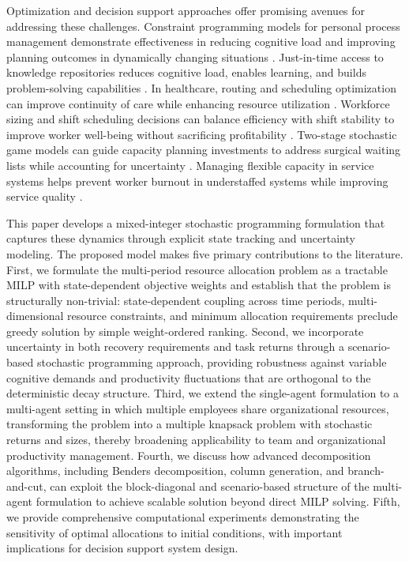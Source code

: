 Optimization and decision support approaches offer promising avenues for addressing these challenges. Constraint programming models for personal process management demonstrate effectiveness in reducing cognitive load and improving planning outcomes in dynamically changing situations \citep{oruç_constraint_2022}. Just-in-time access to knowledge repositories reduces cognitive load, enables learning, and builds problem-solving capabilities \citep{subramani_capability_2021}. In healthcare, routing and scheduling optimization can improve continuity of care while enhancing resource utilization \citep{lahrichi_first_2022}. Workforce sizing and shift scheduling decisions can balance efficiency with shift stability to improve worker well-being without sacrificing profitability \citep{mandal_tactical_2025}. Two-stage stochastic game models can guide capacity planning investments to address surgical waiting lists while accounting for uncertainty \citep{acuna_two_2024}. Managing flexible capacity in service systems helps prevent worker burnout in understaffed systems while improving service quality \citep{yuan_managing_2025}.

This paper develops a mixed-integer stochastic programming formulation that captures these dynamics through explicit state tracking and uncertainty modeling. The proposed model makes five primary contributions to the literature. First, we formulate the multi-period resource allocation problem as a tractable MILP with state-dependent objective weights and establish that the problem is structurally non-trivial: state-dependent coupling across time periods, multi-dimensional resource constraints, and minimum allocation requirements preclude greedy solution by simple weight-ordered ranking. Second, we incorporate uncertainty in both recovery requirements and task returns through a scenario-based stochastic programming approach, providing robustness against variable cognitive demands and productivity fluctuations that are orthogonal to the deterministic decay structure. Third, we extend the single-agent formulation to a multi-agent setting in which multiple employees share organizational resources, transforming the problem into a multiple knapsack problem with stochastic returns and sizes, thereby broadening applicability to team and organizational productivity management. Fourth, we discuss how advanced decomposition algorithms, including Benders decomposition, column generation, and branch-and-cut, can exploit the block-diagonal and scenario-based structure of the multi-agent formulation to achieve scalable solution beyond direct MILP solving. Fifth, we provide comprehensive computational experiments demonstrating the sensitivity of optimal allocations to initial conditions, with important implications for decision support system design.

